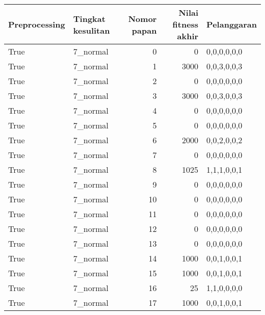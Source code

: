\begin{tabular}{llrrl}
\hline
 Preprocessing   & Tingkat kesulitan   &   Nomor papan &   Nilai fitness akhir & Pelanggaran   \\
\hline
 True            & 7\_normal            &             0 &                     0 & 0,0,0,0,0,0   \\
 True            & 7\_normal            &             1 &                  3000 & 0,0,3,0,0,3   \\
 True            & 7\_normal            &             2 &                     0 & 0,0,0,0,0,0   \\
 True            & 7\_normal            &             3 &                  3000 & 0,0,3,0,0,3   \\
 True            & 7\_normal            &             4 &                     0 & 0,0,0,0,0,0   \\
 True            & 7\_normal            &             5 &                     0 & 0,0,0,0,0,0   \\
 True            & 7\_normal            &             6 &                  2000 & 0,0,2,0,0,2   \\
 True            & 7\_normal            &             7 &                     0 & 0,0,0,0,0,0   \\
 True            & 7\_normal            &             8 &                  1025 & 1,1,1,0,0,1   \\
 True            & 7\_normal            &             9 &                     0 & 0,0,0,0,0,0   \\
 True            & 7\_normal            &            10 &                     0 & 0,0,0,0,0,0   \\
 True            & 7\_normal            &            11 &                     0 & 0,0,0,0,0,0   \\
 True            & 7\_normal            &            12 &                     0 & 0,0,0,0,0,0   \\
 True            & 7\_normal            &            13 &                     0 & 0,0,0,0,0,0   \\
 True            & 7\_normal            &            14 &                  1000 & 0,0,1,0,0,1   \\
 True            & 7\_normal            &            15 &                  1000 & 0,0,1,0,0,1   \\
 True            & 7\_normal            &            16 &                    25 & 1,1,0,0,0,0   \\
 True            & 7\_normal            &            17 &                  1000 & 0,0,1,0,0,1   \\

\end{tabular}
